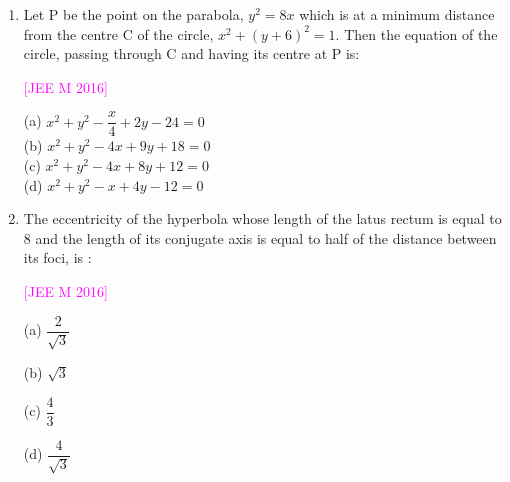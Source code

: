 \documentclass[journal,12pt,twocolumn]{IEEEtran}
\theoremstyle{remark}
\newcommand{\questionA}[6]{
\item #1
    \begin{flushright}
        {\textcolor{magenta}{[#2]}}
    \end{flushright}
    (a) #3\\
    (b) #4\\
    (c) #5\\
    (d) #6\\
}
\newcommand{\questionC}[6]{
\item #1
    \begin{flushright}
        {\textcolor{magenta}{[#2]}}
    \end{flushright}
    \begin{multicols}{4}
        (a) #3
        
        (b) #4
        
        (c) #5
        
        (d) #6
    \end{multicols}
}
\begin{document}
\begin{enumerate}[label=\textcolor{magenta}{\arabic*.}]
\questionA{Let P be the point on the parabola, $y^2=8x$ which is at a minimum distance from the centre C of the circle, $x^2+(y+6)^2=1$. Then the equation of the circle, passing through C and having its centre at P is:}{JEE M 2016}
{$x^2+y^2-\dfrac{x}{4}+2y-24=0$}
{$x^2+y^2-4x+9y+18=0$}
{$x^2+y^2-4x+8y+12=0$}
{$x^2+y^2-x+4y-12=0$}

\questionC{The eccentricity of the hyperbola whose length of the latus rectum is equal to 8 and the length of its conjugate axis is equal to half of the distance between its foci, is :}{JEE M 2016}
{$\dfrac{2}{\sqrt{3}}$}
{$\sqrt{3}$}
{$\dfrac{4}{3}$}
{$\dfrac{4}{\sqrt{3}}$}

\end{enumerate}
\end{document}
